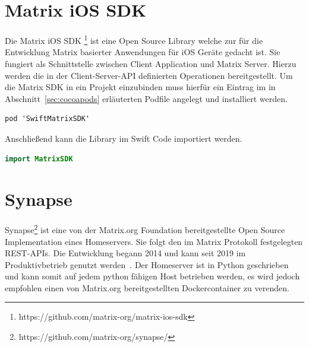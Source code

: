     \section{Matrix iOS SDK}\label{sec:matrix-sdk}
    Die Matrix iOS SDK \footnote{https://github.com/matrix-org/matrix-ios-sdk} ist eine Open Source Library welche zur für die Entwicklung Matrix basierter Anwendungen für iOS Geräte gedacht ist.
    Sie fungiert als Schnittstelle zwischen Client Application und Matrix Server.
    Hierzu werden die in der Client-Server-API definierten Operationen bereitgestellt.
    Um die Matrix SDK in ein Projekt einzubinden muss hierfür ein Eintrag im in Abschnitt~\ref{sec:cocoapods} erläuterten Podfile angelegt und installiert werden.
    ~\cite{matrixiossdk}
    \begin{lstlisting}[language={},label={lst:matrtix-sdk}]
        pod 'SwiftMatrixSDK'
    \end{lstlisting}
    Anschließend kann die Library im Swift Code importiert werden.
    \begin{lstlisting}[language=swift,label={lst:matrtix-sdk-swift}]
        import MatrixSDK
    \end{lstlisting}

    \section{Synapse}\label{sec:synapse}
    Synapse\footnote{https://github.com/matrix-org/synapse/} ist eine von der Matrix.org Foundation bereitgestellte Open Source Implementation eines Homeservers.
    Sie folgt den im Matrix Protokoll festgelegten REST-APIs.
    Die Entwicklung begann 2014 und kann seit 2019 im Produktivbetrieb genutzt werden~\cite{synapse}.
    Der Homeserver ist in Python geschrieben und kann somit auf jedem python fähigen Host betrieben werden, es wird jedoch empfohlen einen von Matrix.org bereitgestellten Dockercontainer zu verenden.

